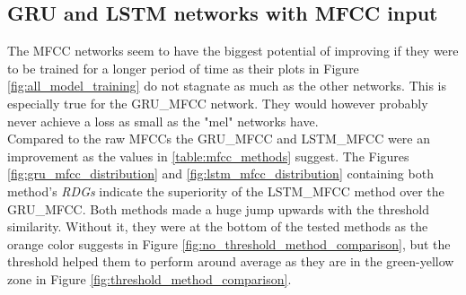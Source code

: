 \subsection{GRU and LSTM networks with MFCC input}\label{ssec:GRU_LSTM_MFCC_results}
The MFCC networks seem to have the biggest potential of improving if they were to be trained for a longer period of time as their plots in Figure \ref{fig:all_model_training} do not stagnate as much as the other networks. This is especially true for the GRU\_MFCC network. They would however probably never achieve a loss as small as the "mel" networks have. \\
Compared to the raw MFCCs the GRU\_MFCC and LSTM\_MFCC were an improvement as the values in \ref{table:mfcc_methods} suggest. The Figures \ref{fig:gru_mfcc_distribution} and \ref{fig:lstm_mfcc_distribution} containing both method's \textit{RDGs} indicate the superiority of the LSTM\_MFCC method over the GRU\_MFCC. Both methods made a huge jump upwards with the threshold similarity. Without it, they were at the bottom of the tested methods as the orange color suggests in Figure \ref{fig:no_threshold_method_comparison}, but the threshold helped them to perform around average as they are in the green-yellow zone in Figure \ref{fig:threshold_method_comparison}.


